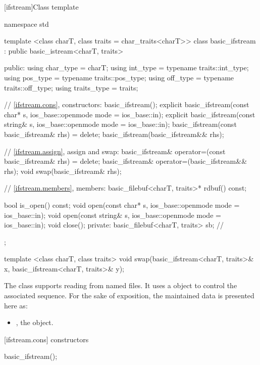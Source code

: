 [ifstream]{Class template }

%
\begin{codeblock}
namespace std {
  template <class charT, class traits = char_traits<charT>>
  class basic_ifstream
    : public basic_istream<charT, traits> {
  public:
    using char_type   = charT;
    using int_type    = typename traits::int_type;
    using pos_type    = typename traits::pos_type;
    using off_type    = typename traits::off_type;
    using traits_type = traits;

    // \ref{ifstream.cons}, constructors:
    basic_ifstream();
    explicit basic_ifstream(const char* s,
                            ios_base::openmode mode = ios_base::in);
    explicit basic_ifstream(const string& s,
                            ios_base::openmode mode = ios_base::in);
    basic_ifstream(const basic_ifstream& rhs) = delete;
    basic_ifstream(basic_ifstream&& rhs);

    // \ref{ifstream.assign}, assign and swap:
    basic_ifstream& operator=(const basic_ifstream& rhs) = delete;
    basic_ifstream& operator=(basic_ifstream&& rhs);
    void swap(basic_ifstream& rhs);

    // \ref{ifstream.members}, members:
    basic_filebuf<charT, traits>* rdbuf() const;

    bool is_open() const;
    void open(const char* s, ios_base::openmode mode = ios_base::in);
    void open(const string& s, ios_base::openmode mode = ios_base::in);
    void close();
  private:
    basic_filebuf<charT, traits> sb; // \expos
  };

  template <class charT, class traits>
    void swap(basic_ifstream<charT, traits>& x,
              basic_ifstream<charT, traits>& y);
}
\end{codeblock}

\pnum
The class
supports reading from named files.
It uses a
object to control the associated
sequence.
For the sake of exposition, the maintained data is presented here as:

\begin{itemize}
\item
{}, the  object.
\end{itemize}

[ifstream.cons]{ constructors}

%
\begin{itemdecl}
basic_ifstream();
\end{itemdecl}

